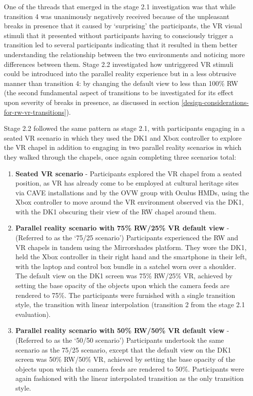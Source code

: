 One of the threads that emerged in the stage 2.1 investigation was that while transition 4 was unanimously negatively received because of the unpleasant breaks in presence that it caused by `surprising' the participants, the VR visual stimuli that it presented without participants having to consciously trigger a transition led to several participants indicating that it resulted in them better understanding the relationship between the two environments and noticing more differences between them. Stage 2.2 investigated how untriggered VR stimuli could be introduced into the parallel reality experience but in a less obtrusive manner than transition 4: by changing the default view to less than 100\% RW (the second fundamental aspect of transitions to be investigated for its effect upon severity of breaks in presence, as discussed in section \ref{design-considerations-for-rw-vr-transitions}).

Stage 2.2 followed the same pattern as stage 2.1, with participants engaging in a seated VR scenario in which they used the DK1 and Xbox controller to explore the VR chapel in addition to engaging in two parallel reality scenarios in which they walked through the chapels, once again completing three scenarios total:

\begin{enumerate}
	\item \textbf{Seated VR scenario} - Participants explored the VR chapel from a seated position, as VR has already come to be employed at cultural heritage sites via CAVE installations and by the OVW group with Oculus HMDs, using the Xbox controller to move around the VR environment observed via the DK1, with the DK1 obscuring their view of the RW chapel around them.
	\item \textbf{Parallel reality scenario with 75\% RW/25\% VR default view} - (Referred to as the `75/25 scenario') Participants experienced the RW and VR chapels in tandem using the Mirrorshades platform. They wore the DK1, held the Xbox controller in their right hand and the smartphone in their left, with the laptop and control box bundle in a satchel worn over a shoulder. The default view on the DK1 screen was 75\% RW/25\% VR, achieved by setting the base opacity of the objects upon which the camera feeds are rendered to 75\%. The participants were furnished with a single transition style, the transition with linear interpolation (transition 2 from the stage 2.1 evaluation).
	\item \textbf{Parallel reality scenario with 50\% RW/50\% VR default view} - (Referred to as the `50/50 scenario') Participants undertook the same scenario as the 75/25 scenario, except that the default view on the DK1 screen was 50\% RW/50\% VR, achieved by setting the base opacity of the objects upon which the camera feeds are rendered to 50\%. Participants were again fashioned with the linear interpolated transition as the only transition style.
\end{enumerate}


